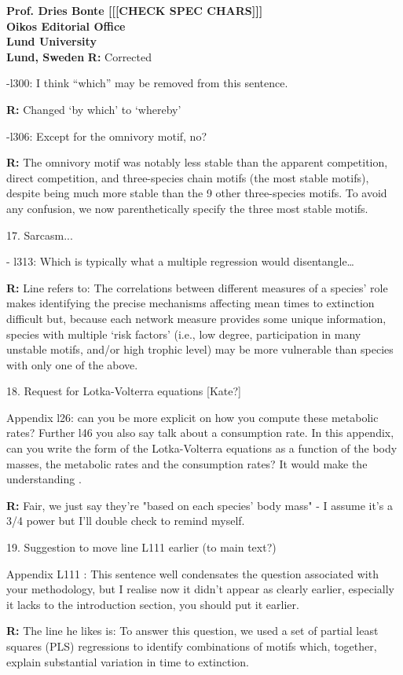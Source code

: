 \documentclass[12pt]{letter}
\begin{document}
\begin{letter}{\bf Prof. Dries Bonte [[[CHECK SPEC CHARS]]]\\
Oikos Editorial Office \\
Lund University \\
Lund, Sweden}
        \textbf{R:} Corrected

      -l300: I think “which” may be removed from this sentence.

        \textbf{R:} Changed `by which' to `whereby'

      -l306: Except for the omnivory motif, no?

        \textbf{R:} The omnivory motif was notably less stable than the apparent competition, direct competition, and three-species chain motifs (the most stable motifs), despite being much more stable than the 9 other three-species motifs. To avoid any confusion, we now parenthetically specify the three most stable motifs.


    17. Sarcasm...

      - l313: Which is typically what a multiple regression would disentangle…

      \textbf{R:} Line refers to: 
              The correlations between different measures of a species' role makes identifying the precise mechanisms affecting mean times to extinction difficult but, because each network measure provides some unique information, species with multiple `risk factors' (i.e., low degree, participation in many unstable motifs, and/or high trophic level) may be more vulnerable than species with only one of the above.


    18. Request for Lotka-Volterra equations [Kate?]

      Appendix l26: can you be more explicit on how you compute these metabolic rates? Further l46 you also say talk about a consumption rate. In this appendix, can you write the form of the Lotka-Volterra equations as a function of the body masses, the metabolic rates and the consumption rates? It would make the understanding .

      \textbf{R:}
      Fair, we just say they're "based on each species' body mass" - I assume it's a 3/4 power but I'll double check to remind myself.


    19. Suggestion to move line L111 earlier (to main text?)

      Appendix L111 : This sentence well condensates the question associated with your methodology, but I realise now it didn’t appear as clearly earlier, especially it lacks to the introduction section, you should put it earlier.


      \textbf{R:} The line he likes is:   To answer this question, we used a set of partial least squares (PLS) regressions to identify combinations of motifs which, together, explain substantial variation in time to extinction. 



\end{letter}
\end{document}
